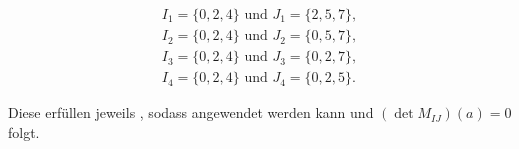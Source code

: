 {\begin{align*}
    I_1=\{0,2,4\} \text{ und } J_1=\{2,5,7\}, \\
    I_2=\{0,2,4\} \text{ und } J_2=\{0,5,7\}, \\
    I_3=\{0,2,4\} \text{ und } J_3=\{0,2,7\}, \\
    I_4=\{0,2,4\} \text{ und } J_4=\{0,2,5\}.
\end{align*}

Diese erfüllen jeweils , sodass  angewendet werden kann und $(\det M_{IJ})(a) = 0$ folgt.
}

\begin{comment}
    Anstatt alle Teilmengen von $J$ einer bestimmten Kardinalität auf die Bedingung zu prüfen, kann auch das minimale $\gamma$ gesucht werden    
\end{comment}